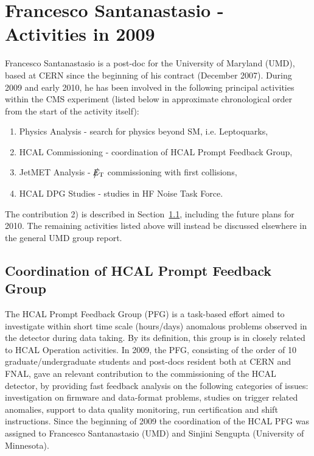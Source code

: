 \documentclass[a4paper,11pt]{article}
\def\etmiss{\big\slash\hspace{-1.6ex}{E_\text{T}}}
\begin{document}

\section{Francesco Santanastasio - Activities in 2009}

Francesco Santanastasio is a post-doc for the University of Maryland (UMD), 
based at CERN since the beginning of his contract (December 2007).
During 2009 and early 2010, he has been involved in the 
following principal activities within the CMS experiment
(listed below in approximate chronological order from the start of the activity itself):
%
\begin{enumerate}
\item Physics Analysis - search for physics beyond SM, i.e. Leptoquarks,
\item HCAL Commissioning -  coordination of HCAL Prompt Feedback Group,
\item JetMET Analysis - $\etmiss$ commissioning with first collisions,
\item HCAL DPG Studies - studies in HF Noise Task Force.
\end{enumerate}
%
The contribution 2) is described in Section~\ref{sec:PFG},
including the future plans for 2010. The remaining activities listed above 
will instead be discussed elsewhere in the general UMD group report.
%
\subsection{Coordination of HCAL Prompt Feedback Group} \label{sec:PFG}
%
The HCAL Prompt Feedback Group (PFG) is a task-based effort aimed to investigate 
within short time scale (hours/days) anomalous problems observed in the 
detector during data taking. By its definition, this group is in closely related to 
HCAL Operation activities. In 2009, the PFG, consisting of the order of 10
graduate/undergraduate students and post-docs resident both at CERN and FNAL, 
gave an relevant contribution to the commissioning of the HCAL detector, 
by providing fast feedback analysis on the following categories of issues: 
investigation on firmware and data-format problems, studies on trigger related anomalies, 
support to data quality monitoring, run certification and shift instructions. 
Since the beginning of 2009 the coordination of the HCAL PFG was assigned 
to Francesco Santanastasio (UMD) and Sinjini Sengupta 
(University of Minnesota). 
\end{document}
